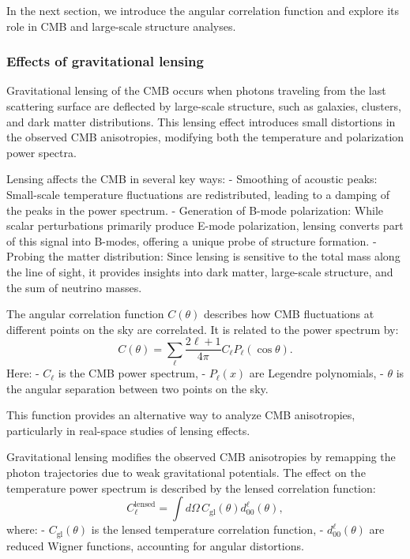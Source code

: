\documentclass{aa}
\begin{document}
In the next section, we introduce the angular correlation function and explore its role in CMB and large-scale structure analyses.
\color{black}






\subsubsection{Effects of gravitational lensing}
\color{Plum}
Gravitational lensing of the CMB occurs when photons traveling from the last scattering surface are deflected by large-scale structure, such as galaxies, clusters, and dark matter distributions. This lensing effect introduces small distortions in the observed CMB anisotropies, modifying both the temperature and polarization power spectra.  

Lensing affects the CMB in several key ways:
- Smoothing of acoustic peaks: Small-scale temperature fluctuations are redistributed, leading to a damping of the peaks in the power spectrum.  
- Generation of B-mode polarization: While scalar perturbations primarily produce E-mode polarization, lensing converts part of this signal into B-modes, offering a unique probe of structure formation.  
- Probing the matter distribution: Since lensing is sensitive to the total mass along the line of sight, it provides insights into dark matter, large-scale structure, and the sum of neutrino masses.

The angular correlation function $C(\theta)$ describes how CMB fluctuations at different points on the sky are correlated. It is related to the power spectrum by:
\begin{equation}
C(\theta) = \sum_{\ell} \frac{2\ell + 1}{4\pi} C_\ell P_\ell(\cos\theta).
\end{equation}
Here:
- $C_\ell$ is the CMB power spectrum,  
- $P_\ell(x)$ are Legendre polynomials,  
- $\theta$ is the angular separation between two points on the sky.

This function provides an alternative way to analyze CMB anisotropies, particularly in real-space studies of lensing effects.

Gravitational lensing modifies the observed CMB anisotropies by remapping the photon trajectories due to weak gravitational potentials. The effect on the temperature power spectrum is described by the lensed correlation function:
\begin{equation}
C_{\ell}^{\text{lensed}} = \int d\Omega \, C_{\text{gl}}(\theta) d_{00}^\ell(\theta),
\end{equation}
where:
- $C_{\text{gl}}(\theta)$ is the lensed temperature correlation function,  
- $d_{00}^\ell(\theta)$ are reduced Wigner functions, accounting for angular distortions.
\end{document}
